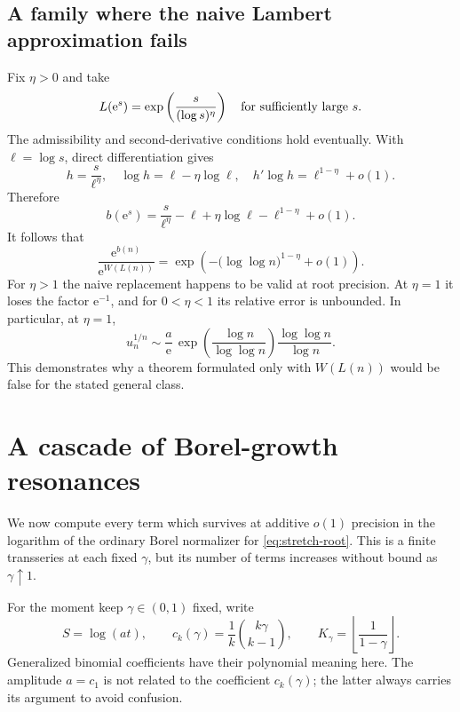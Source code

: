 \documentclass[11pt,a4paper]{article}
\numberwithin{equation}{section}
\theoremstyle{definition}
\theoremstyle{remark}
\newcommand{\ee}{\mathrm e}
\begin{document}
\subsection{A family where the naive Lambert approximation fails}
Fix $\eta>0$ and take
\begin{equation}
 L(\ee^s)=\exp\left(\frac{s}{(\log s)^\eta}\right)
 \quad\hbox{for sufficiently large }s.
 \label{eq:fast-slow}
\end{equation}
The admissibility and second-derivative conditions hold eventually.
With $\ell=\log s$, direct differentiation gives
\[
 h=\frac{s}{\ell^\eta},\quad
 \log h=\ell-\eta\log\ell,\quad
 h'\log h=\ell^{1-\eta}+o(1).
\]
Therefore
\begin{equation}
 b(\ee^s)=\frac{s}{\ell^\eta}-\ell+\eta\log\ell
            -\ell^{1-\eta}+o(1).
 \label{eq:fast-slow-b}
\end{equation}
It follows that
\begin{equation}
 \frac{\ee^{b(n)}}{\ee^{W(L(n))}}
 =\exp\left(-\bigl(\log\log n\bigr)^{1-\eta}+o(1)\right).
 \label{eq:naive-failure}
\end{equation}
For $\eta>1$ the naive replacement happens to be valid at root precision.
At $\eta=1$ it loses the factor $\ee^{-1}$, and for $0<\eta<1$ its
relative error is unbounded. In particular, at $\eta=1$,
\begin{equation}
 u_n^{1/n}\sim
 \frac{a}{\ee}\,
 \exp\left(\frac{\log n}{\log\log n}\right)
 \frac{\log\log n}{\log n}.
 \label{eq:eta-one}
\end{equation}
This demonstrates why a theorem formulated only with $W(L(n))$ would
be false for the stated general class.

\section{A cascade of Borel-growth resonances}
\label{sec:resonance}

We now compute every term which survives at additive $o(1)$ precision
in the logarithm of the ordinary Borel normalizer for
\eqref{eq:stretch-root}. This is a finite transseries at each fixed
$\gamma$, but its number of terms increases without bound as
$\gamma\uparrow1$.

For the moment keep $\gamma\in(0,1)$ fixed, write
\begin{equation}
 S=\log(at),\qquad
 c_k(\gamma)=\frac1k\binom{k\gamma}{k-1},\qquad
 K_\gamma=\left\lfloor\frac1{1-\gamma}\right\rfloor.
 \label{eq:ck}
\end{equation}
Generalized binomial coefficients have their polynomial meaning here.
The amplitude $a=c_1$ is not related to the coefficient
$c_k(\gamma)$; the latter always carries its argument to avoid confusion.
\end{document}
